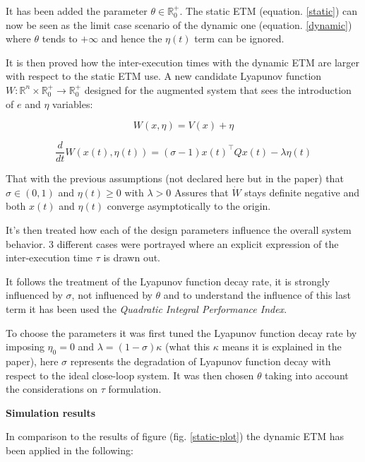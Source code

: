 \documentclass[12pt]{article}
\begin{document}
It has been added the parameter $\theta \in \mathbb{R}^{+}_0$. The static ETM (equation. \ref{static}) can now be seen as the limit case scenario of the dynamic one (equation. \ref{dynamic}) where $\theta$ tends to $+ \infty$ and hence the $\eta(t)$ term can be ignored.

It is then proved how the inter-execution times with the dynamic ETM are larger with respect to the static ETM use. A new candidate Lyapunov function $W : \mathbb{R}^n \times \mathbb{R}_0^+ \to \mathbb{R}_0^+$ designed for the augmented system that sees the introduction of $e$ and $\eta$ variables:

\begin{equation}
  W(x, \eta) = V(x) + \eta 
\end{equation}

\begin{equation}
  \frac{d}{dt} W(x(t), \eta(t)) = \left( \sigma - 1 \right) x(t)^{\top} Q x(t) - \lambda \eta(t)
\end{equation}

That with the previous assumptions (not declared here but in the paper) that $\sigma \in \left( 0,1 \right)$ and $\eta(t) \geq 0$ with $\lambda > 0$ Assures that $\dot{W}$ stays definite negative and both $x(t)$ and $\eta(t)$ converge asymptotically to the origin.

It's then treated how each of the design parameters influence the overall system behavior. 3 different cases were portrayed where an explicit expression of the inter-execution time $\tau$ is drawn out.

It follows the treatment of the Lyapunov function decay rate, it is strongly influenced by $\sigma$, not influenced by $\theta$ and to understand the influence of this last term it has been used the \textit{Quadratic Integral Performance Index}.

To choose the parameters it was first tuned the Lyapunov function decay rate by imposing $\eta_0 = 0$ and $\lambda = (1 - \sigma) \kappa$ (what this $\kappa$ means it is explained in the paper), here $\sigma$ represents the degradation of Lyapunov function decay with respect to the ideal close-loop system. It was then chosen $\theta$ taking into account the considerations on $\tau$ formulation.

\textbf{Simulation results}

In comparison to the results of figure (fig. \ref{static-plot}) the dynamic ETM has been applied in the following:
\end{document}
